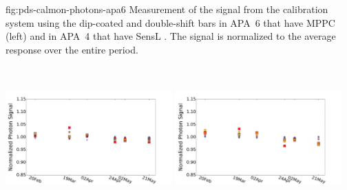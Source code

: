 \begin{dunefigure}
 {fig:pds-calmon-photons-apa6}
 {Measurement of the signal from the calibration system using the dip-coated and double-shift bars in APA~6 that have MPPC  (left) and in APA~4 that have SensL . The signal is normalized to the average response over the entire period.
 }

  \includegraphics[height=5.5cm,width=0.48\textwidth]{graphics/pds-avg-mean-adc-led-apa6-mppc.pdf}
  \includegraphics[height=5.5cm,width=0.48\textwidth]{graphics/pds-avg-mean-adc-led-apa4-sensl.pdf}

\end{dunefigure}

